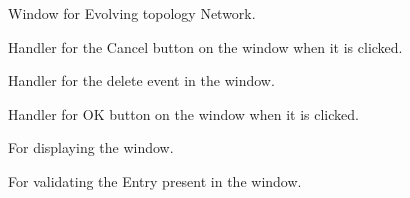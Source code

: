 \documentclass[letterpaper,10pt,english]{sphinxmanual}
\begin{document}
\begin{fulllineitems}
\label{index:network_evol.Network_evol}
Window for Evolving topology Network.


\begin{fulllineitems}
\label{index:network_evol.Network_evol.on_cancel}
Handler for the Cancel button on the window when it is clicked.

\end{fulllineitems}



\begin{fulllineitems}
\label{index:network_evol.Network_evol.on_evol_window_delete_event}
Handler for the delete event in the window.

\end{fulllineitems}



\begin{fulllineitems}
\label{index:network_evol.Network_evol.on_ok}
Handler for OK button on the window when it is clicked.

\end{fulllineitems}



\begin{fulllineitems}
\label{index:network_evol.Network_evol.show}
For displaying the window.

\end{fulllineitems}



\begin{fulllineitems}
\label{index:network_evol.Network_evol.validate}
For validating the Entry present in the window.

\end{fulllineitems}


\end{fulllineitems}
\end{document}
